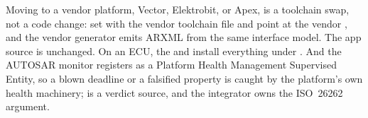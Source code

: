 \begin{notebox}
Moving to a vendor platform, Vector, Elektrobit, or Apex, is a toolchain swap, not a code change: set  with the vendor toolchain file and point  at the vendor , and the vendor generator emits ARXML from the same interface model. The app source is unchanged. On an ECU, the  and  install everything under . And the AUTOSAR monitor registers as a Platform Health Management Supervised Entity, so a blown deadline or a falsified property is caught by the platform's own health machinery; \sentil{} is a verdict source, and the integrator owns the ISO~26262 argument.
\end{notebox}